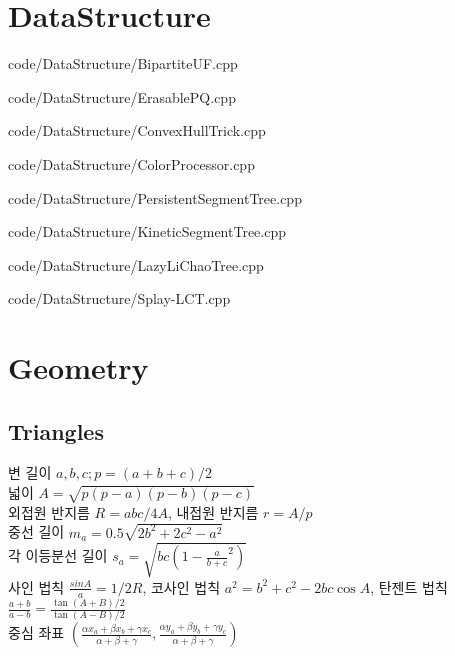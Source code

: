 \documentclass[landscape, 8pt, a4paper, oneside]{extarticle}
\begin{document}
\begin{multicols*}{3}

\maketitlepage



\section{DataStructure}

{code/DataStructure/BipartiteUF.cpp}

{code/DataStructure/ErasablePQ.cpp}

{code/DataStructure/ConvexHullTrick.cpp}

{code/DataStructure/ColorProcessor.cpp}

{code/DataStructure/PersistentSegmentTree.cpp}

{code/DataStructure/KineticSegmentTree.cpp}

{code/DataStructure/LazyLiChaoTree.cpp}

{code/DataStructure/Splay-LCT.cpp}

\section{Geometry}

\subsection{Triangles} %

\noindent
변 길이 $a, b, c; p = (a+b+c)/2$ \\
넓이 $A = \sqrt{p(p-a)(p-b)(p-c)}$ \\
외접원 반지름 $R = abc/4A$, 내접원 반지름 $r = A/p$ \\
중선 길이 $m_a = 0.5\sqrt{2b^2 + 2c^2 - a^2}$ \\
각 이등분선 길이 $s_a = \sqrt{bc(1-\frac{a}{b+c}^2)}$ \\
사인 법칙 $\frac{sin A}{a} = 1/2R$, 코사인 법칙 $a^2 = b^2 + c^2 - 2bc\cos A$, 탄젠트 법칙 $\frac{a+b}{a-b} = \frac{\tan (A+B)/2}{\tan (A-B)/2}$ \\
중심 좌표 $(\frac{\alpha x_a + \beta x_b + \gamma x_c}{\alpha+\beta+\gamma}, \frac{\alpha y_a + \beta y_b + \gamma y_c}{\alpha+\beta+\gamma})$ \\


\end{multicols*}
\end{document}
